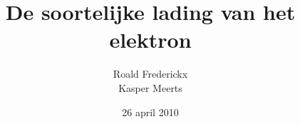 \documentclass[11pt,a4paper]{article}
\author{Roald Frederickx\\Kasper Meerts}
\title{De soortelijke lading van het elektron}
\date{26 april 2010}
\begin{document}
\graphicspath{{"./afbeeldingen/"}}
\maketitle



%






\end{document}
